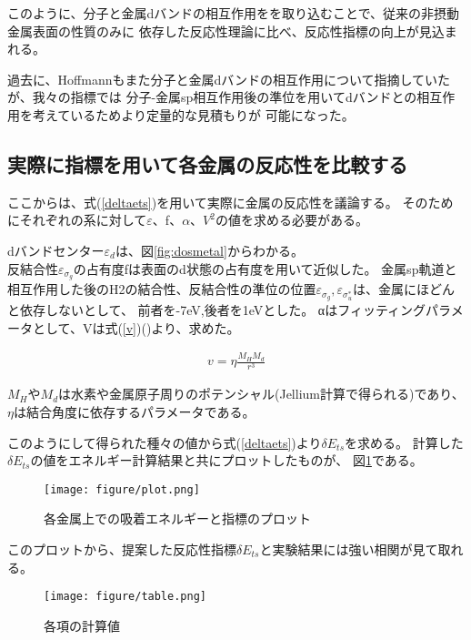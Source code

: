 \documentclass[12pt]{ltjsarticle}
\begin{document}
このように、分子と金属dバンドの相互作用をを取り込むことで、従来の非摂動金属表面の性質のみに
依存した反応性理論に比べ、反応性指標の向上が見込まれる。

過去に、Hoffmannもまた分子と金属dバンドの相互作用について指摘していたが、我々の指標では
分子-金属sp相互作用後の準位を用いてdバンドとの相互作用を考えているためより定量的な見積もりが
可能になった。

\subsection{実際に指標を用いて各金属の反応性を比較する}
ここからは、式(\ref{deltaets})を用いて実際に金属の反応性を議論する。
そのためにそれぞれの系に対して$\varepsilon$、f、$\alpha$、$V^2$の値を求める必要がある。

dバンドセンター$\varepsilon_d$は、図\ref{fig:dosmetal}からわかる。\\
反結合性$\varepsilon _{\sigma_g}$の占有度fは表面のd状態の占有度を用いて近似した。
金属sp軌道と相互作用した後のH2の結合性、反結合性の準位の位置$\varepsilon _{\sigma_g},
\varepsilon _{\sigma_u^*}$は、金属にほどんと依存しないとして、
前者を-7eV,後者を1eVとした。
αはフィッティングパラメータとして、Vは式(\ref{v})(\cite{Nørskov1989})より、求めた。

\begin{eqnarray}
    \label{v}
    v = \eta \frac{ M_H M_d }{r^3}
\end{eqnarray}

$M_H$や$M_d$は水素や金属原子周りのポテンシャル(Jellium計算で得られる)であり、
$\eta$は結合角度に依存するパラメータである。

このようにして得られた種々の値から式(\ref{deltaets})より$\delta E_{ts}$を求める。
計算した$\delta E_{ts}$の値をエネルギー計算結果と共にプロットしたものが、
図\ref{fig:plot}である。

\begin{figure}[hbtp]
    \begin{center}
     \texttt{[image: figure/plot.png]}
    \end{center}
    \caption{各金属上での吸着エネルギーと指標のプロット}
    \label{fig:plot}
\end{figure}

このプロットから、提案した反応性指標$\delta E_{ts}$と実験結果には強い相関が見て取れる。

\begin{figure}[hbtp]
    \begin{center}
     \texttt{[image: figure/table.png]}
    \end{center}
    \caption{各項の計算値}
    \label{fig:table}
\end{figure}
\end{document}
